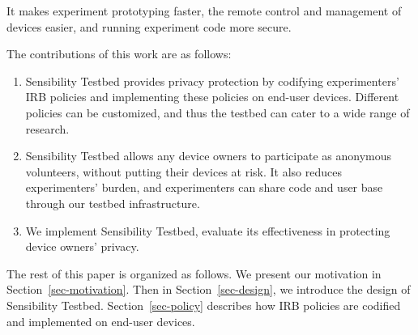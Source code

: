%
It makes experiment
prototyping faster, the remote control and management of devices
easier, and running experiment code more secure. 

The contributions of this work are as follows:

\begin{enumerate}

\item Sensibility Testbed provides privacy protection by 
codifying experimenters' IRB policies and implementing 
these policies on end-user devices. Different policies can 
be customized, and thus the testbed can cater to a wide 
range of research.


\item Sensibility Testbed allows any device owners to participate 
as anonymous volunteers, without putting their devices at risk. 
It also reduces experimenters' burden, and experimenters can share 
code and user base through our testbed infrastructure.


\item We implement Sensibility Testbed, evaluate its effectiveness
in protecting device owners' privacy. 
\end{enumerate}

The rest of this paper is organized as follows. We present our
motivation in Section~\ref{sec-motivation}. Then in Section~\ref{sec-design}, 
we introduce the design of Sensibility Testbed. Section~\ref{sec-policy}
describes how IRB policies are codified and implemented on end-user
devices.
